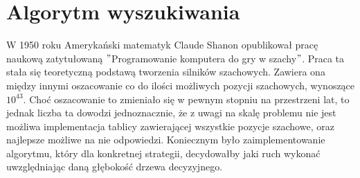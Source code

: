 \usepackage{biblatex}\section{Algorytm wyszukiwania}
\label {sec:algorytm-wyszukiwania}

W 1950 roku Amerykański matematyk Claude Shanon opublikował pracę naukową zatytułowaną \("\)Programowanie komputera do gry w szachy\("\)\cite*{Shannon1950XXIIPA}.
Praca ta stała się teoretyczną podstawą tworzenia silników szachowych.
Zawiera ona między innymi oszacowanie co do ilości możliwych pozycji szachowych, wynoszące $10^{43}$.
Choć oszacowanie to zmieniało się w pewnym stopniu na przestrzeni lat, to jednak liczba ta dowodzi jednoznacznie, że z uwagi na skalę problemu nie jest możliwa implementacja tablicy zawierającej wszystkie pozycje szachowe, oraz najlepsze możliwe na nie odpowiedzi.
Koniecznym było zaimplementowanie algorytmu, który dla konkretnej strategii, decydowałby jaki ruch wykonać uwzględniając daną głębokość drzewa decyzyjnego.







